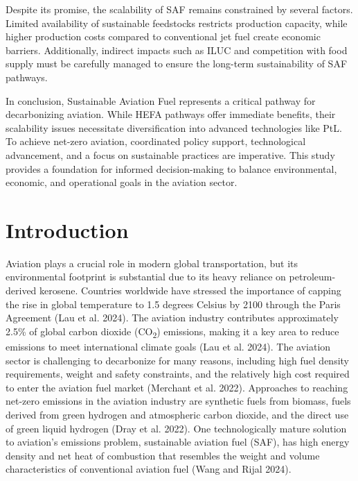 \documentclass[12pt]{article}
\begin{document}
Despite its promise, the scalability of SAF remains constrained by several factors. Limited availability of sustainable feedstocks restricts production capacity, while higher production costs compared to conventional jet fuel create economic barriers. Additionally, indirect impacts such as ILUC and competition with food supply must be carefully managed to ensure the long-term sustainability of SAF pathways.

In conclusion, Sustainable Aviation Fuel represents a critical pathway for decarbonizing aviation. While HEFA pathways offer immediate benefits, their scalability issues necessitate diversification into advanced technologies like PtL. To achieve net-zero aviation, coordinated policy support, technological advancement, and a focus on sustainable practices are imperative. This study provides a foundation for informed decision-making to balance environmental, economic, and operational goals in the aviation sector.

\section{Introduction}
Aviation plays a crucial role in modern global transportation, but its environmental footprint is substantial due to its heavy reliance on petroleum-derived kerosene. Countries worldwide have stressed the importance of capping the rise in global temperature to 1.5 degrees Celsius by 2100 through the Paris Agreement (Lau et al. 2024). The aviation industry contributes approximately 2.5\% of global carbon dioxide (CO\textsubscript{2}) emissions, making it a key area to reduce emissions to meet international climate goals (Lau et al. 2024). The aviation sector is challenging to decarbonize for many reasons, including high fuel density requirements, weight and safety constraints, and the relatively high cost required to enter the aviation fuel market (Merchant et al. 2022). Approaches to reaching net-zero emissions in the aviation industry are synthetic fuels from biomass, fuels derived from green hydrogen and atmospheric carbon dioxide, and the direct use of green liquid hydrogen (Dray et al. 2022). One technologically mature solution to aviation’s emissions problem, sustainable aviation fuel (SAF), has high energy density and net heat of combustion that resembles the weight and volume characteristics of conventional aviation fuel (Wang and Rijal 2024).  
\end{document}
